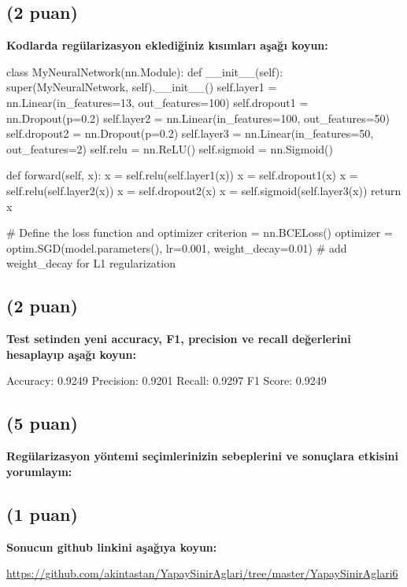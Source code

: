 \documentclass[11pt]{article}
\begin{document}
\subsection{(2 puan)} \textbf{Kodlarda regülarizasyon eklediğiniz kısımları aşağı koyun:} 

\begin{python}

class MyNeuralNetwork(nn.Module):
    def __init__(self):
        super(MyNeuralNetwork, self).__init__()
        self.layer1 = nn.Linear(in_features=13, out_features=100) 
        self.dropout1 = nn.Dropout(p=0.2)
        self.layer2 = nn.Linear(in_features=100, out_features=50)
        self.dropout2 = nn.Dropout(p=0.2)
        self.layer3 = nn.Linear(in_features=50, out_features=2)
        self.relu = nn.ReLU()
        self.sigmoid = nn.Sigmoid()
        
    def forward(self, x):
        x = self.relu(self.layer1(x))
        x = self.dropout1(x)
        x = self.relu(self.layer2(x))
        x = self.dropout2(x)
        x = self.sigmoid(self.layer3(x))
        return x


# Define the loss function and optimizer
criterion = nn.BCELoss()
optimizer = optim.SGD(model.parameters(), lr=0.001, weight_decay=0.01) # add weight_decay for L1 regularization


\end{python}

\subsection{(2 puan)} \textbf{Test setinden yeni accuracy, F1, precision ve recall değerlerini hesaplayıp aşağı koyun:}

Accuracy: 0.9249
Precision: 0.9201
Recall: 0.9297
F1 Score: 0.9249

\subsection{(5 puan)} \textbf{Regülarizasyon yöntemi seçimlerinizin sebeplerini ve sonuçlara etkisini yorumlayın:}



\subsection{(1 puan)} \textbf{Sonucun github linkini  aşağıya koyun:}

\url{https://github.com/akintastan/YapaySinirAglari/tree/master/YapaySinirAglari6}
\end{document}
